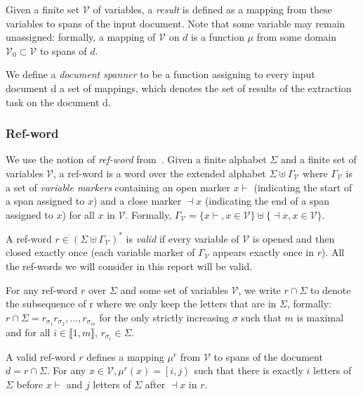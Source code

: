 \documentclass[12px]{article}
\newcommand{\Span}[1]{\left[ #1 \right\rangle}
\begin{document}
        Given a finite set $\mathcal{V}$ of variables, a \textit{result} is
        defined as a mapping from these variables to spans of the input
        document.  Note that some variable may remain unassigned: formally, a
        mapping of $\mathcal{V}$ on $d$ is a function $\mu$ from some domain
        $\mathcal{V}_0 \subset \mathcal{V}$ to spans of $d$.

        We define a \textit{document spanner} to be a function assigning to
        every input document d a set of mappings, which denotes the set of
        results of the extraction task on the document d.

      \subsubsection{Ref-word}

        We use the notion of \emph{ref-word} from~\cite{peterfreund}. Given a
        finite alphabet $\Sigma$ and a finite set of variables $\mathcal{V}$, a
        ref-word is a word over the extended alphabet $\Sigma \uplus
        \Gamma_\mathcal{V}$ where $\Gamma_\mathcal{V}$ is a set of
        \textit{variable markers} containing an open marker $x{\vdash}$
        (indicating the start of a span assigned to $x$) and a close marker
        ${\dashv}x$ (indicating the end of a span assigned to $x$) for all $x$
        in $\mathcal{V}$. Formally, $\Gamma_\mathcal{V} = \{x{\vdash}, x \in
        \mathcal{V}\} \uplus \{{\dashv}x, x \in \mathcal{V}\}$.

        A ref-word $r \in {(\Sigma \uplus \Gamma_\mathcal{V})}^*$ is
        \textit{valid} if every variable of $\mathcal{V}$ is opened and then
        closed exactly once (each variable marker of $\Gamma_\mathcal{V}$
        appears exactly once in $r$). All the ref-words we will consider in
        this report will be valid.

        For any ref-word $r$ over $\Sigma$ and some set of variables
        $\mathcal{V}$, we write $r \cap \Sigma$ to denote the subsequence of r
        where we only keep the letters that are in $\Sigma$, formally: $r \cap
        \Sigma = r_{\sigma_1} r_{\sigma_2}, \ldots, r_{\sigma_m}$ for the only
        strictly increasing $\sigma$ such that $m$ is maximal and for all $i
        \in \llbracket 1, m \rrbracket$, $r_{\sigma_i} \in \Sigma$.

        A valid ref-word $r$ defines a mapping $\mu^r$ from $\mathcal{V}$ to
        spans of the document $d = r \cap \Sigma$. For any $x \in \mathcal{V},
        \mu^r (x) = \Span{i, j}$ such that there is exactly $i$ letters of
        $\Sigma$ before $x{\vdash}$ and $j$ letters of $\Sigma$ after
        ${\dashv}x$ in $r$.
\end{document}
